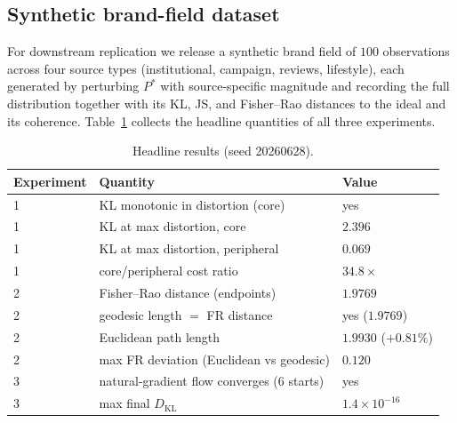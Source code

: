 \documentclass[11pt]{article}
\theoremstyle{remark}
\newcommand{\Pstar}{P^{*}}
\begin{document}
\subsection{Synthetic brand-field dataset}
For downstream replication we release a synthetic brand field of $100$
observations across four source types (institutional, campaign, reviews,
lifestyle), each generated by perturbing $\Pstar$ with source-specific
magnitude and recording the full distribution together with its KL, JS, and
Fisher--Rao distances to the ideal and its coherence. Table~\ref{tab:summary}
collects the headline quantities of all three experiments.

\begin{table}[ht]
\centering
\caption{Headline results (seed 20260628).}
\label{tab:summary}
\small
\begin{tabular}{lll}
\toprule
Experiment & Quantity & Value \\
\midrule
1 & KL monotonic in distortion (core) & yes \\
1 & KL at max distortion, core & $2.396$ \\
1 & KL at max distortion, peripheral & $0.069$ \\
1 & core/peripheral cost ratio & $34.8\times$ \\
2 & Fisher--Rao distance (endpoints) & $1.9769$ \\
2 & geodesic length $=$ FR distance & yes ($1.9769$) \\
2 & Euclidean path length & $1.9930$ ($+0.81\%$) \\
2 & max FR deviation (Euclidean vs geodesic) & $0.120$ \\
3 & natural-gradient flow converges (6 starts) & yes \\
3 & max final $D_{\mathrm{KL}}$ & $1.4\times10^{-16}$ \\
\bottomrule
\end{tabular}
\end{table}
\end{document}
